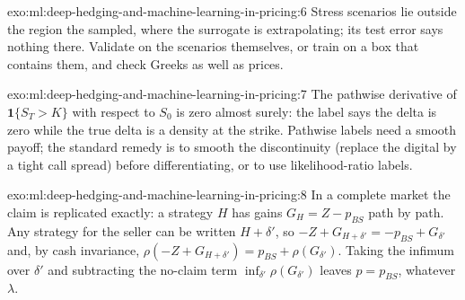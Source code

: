 \begin{solution}{exo:ml:deep-hedging-and-machine-learning-in-pricing:6}
Stress scenarios lie outside the region the  sampled, where the surrogate is extrapolating; its test error says nothing
there. Validate on the scenarios themselves, or train on a box that contains them, and check Greeks as well as prices.
\end{solution}

\begin{solution}{exo:ml:deep-hedging-and-machine-learning-in-pricing:7}
The pathwise derivative of $\mathbf1\{S_T > K\}$ with respect to $S_0$ is zero almost surely: the label says the delta is zero
while the true delta is a density at the strike. Pathwise labels need a smooth payoff; the standard remedy is to smooth the
discontinuity (replace the digital by a tight call spread) before differentiating, or to use likelihood-ratio labels.
\end{solution}

\begin{solution}{exo:ml:deep-hedging-and-machine-learning-in-pricing:8}
In a complete market the claim is replicated exactly: a strategy $H$ has gains $G_H = Z - p_{BS}$ path by path. Any strategy
for the seller can be written $H + \delta'$, so $-Z + G_{H + \delta'} = -p_{BS} + G_{\delta'}$ and, by cash invariance,
$\rho(-Z + G_{H+\delta'}) = p_{BS} + \rho(G_{\delta'})$. Taking the infimum over $\delta'$ and subtracting the no-claim term
$\inf_{\delta'}\rho(G_{\delta'})$ leaves $p = p_{BS}$, whatever $\lambda$.
\end{solution}

